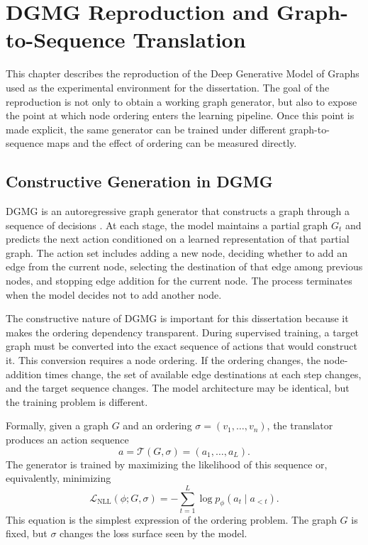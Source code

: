 \chapter{DGMG Reproduction and Graph-to-Sequence Translation}
\label{chap:dgmg-reproduction}

This chapter describes the reproduction of the Deep Generative Model of Graphs used as the experimental environment for the dissertation. The goal of the reproduction is not only to obtain a working graph generator, but also to expose the point at which node ordering enters the learning pipeline. Once this point is made explicit, the same generator can be trained under different graph-to-sequence maps and the effect of ordering can be measured directly.

\section{Constructive Generation in DGMG}
\label{sec:dgmg-constructive-generation}

DGMG is an autoregressive graph generator that constructs a graph through a sequence of decisions \cite{li2018learning}. At each stage, the model maintains a partial graph $G_t$ and predicts the next action conditioned on a learned representation of that partial graph. The action set includes adding a new node, deciding whether to add an edge from the current node, selecting the destination of that edge among previous nodes, and stopping edge addition for the current node. The process terminates when the model decides not to add another node.

The constructive nature of DGMG is important for this dissertation because it makes the ordering dependency transparent. During supervised training, a target graph must be converted into the exact sequence of actions that would construct it. This conversion requires a node ordering. If the ordering changes, the node-addition times change, the set of available edge destinations at each step changes, and the target sequence changes. The model architecture may be identical, but the training problem is different.

Formally, given a graph $G$ and an ordering $\sigma=(v_1,\ldots,v_n)$, the translator produces an action sequence
\begin{equation}
    a = \mathcal{T}(G,\sigma)=(a_1,\ldots,a_L).
\end{equation}
The generator is trained by maximizing the likelihood of this sequence or, equivalently, minimizing
\begin{equation}
    \mathcal{L}_{\mathrm{NLL}}(\phi;G,\sigma)
    = -\sum_{t=1}^{L}\log p_\phi(a_t\mid a_{<t}).
\end{equation}
This equation is the simplest expression of the ordering problem. The graph $G$ is fixed, but $\sigma$ changes the loss surface seen by the model.

